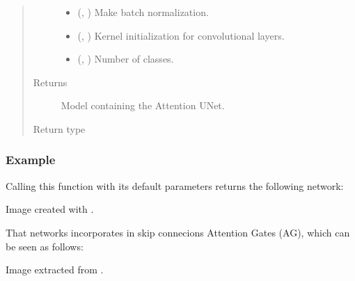 \documentclass[letterpaper,10pt,english]{sphinxmanual}
\begin{document}
\begin{fulllineitems}
\begin{quote}
\begin{description}
\begin{itemize}
\item {} 
 (, ) \textendash{} Make batch normalization.

\item {} 
 (, ) \textendash{} Kernel initialization for convolutional layers.

\item {} 
 (, ) \textendash{} Number of classes.

\end{itemize}

\item[{Returns}] \leavevmode
{} \textendash{} Model containing the Attention U\sphinxhyphen{}Net.

\item[{Return type}] \leavevmode
{}

\end{description}\end{quote}
\subsubsection*{Example}

Calling this function with its default parameters returns the following network:


Image created with .

That networks incorporates in skip connecions Attention Gates (AG), which
can be seen as follows:


Image extracted from .

\end{fulllineitems}
\end{document}
